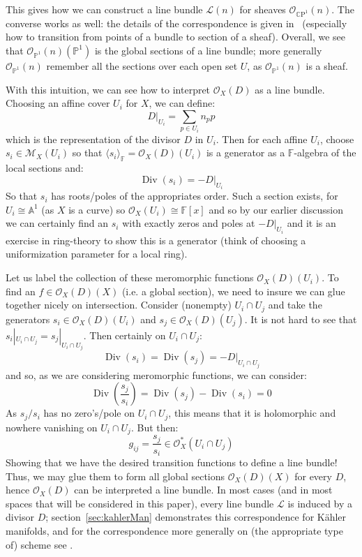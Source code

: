 \documentclass{book}
\newcommand{\A}{{\mathbb{A}}}
\newcommand{\F}{{\mathbb{F}}}
\renewcommand{\P}{{\mathbb{P}}}
\newcommand{\CM}{{\mathcal{M}}}
\newcommand{\CL}{{\mathcal{L}}}
\newcommand{\CO}{{\mathcal{O}}}
\newcommand{\CP}{{\mathbb{C}\mathrm{P}}}
\renewcommand{\div}{{\operatorname{Div}}}
\begin{document}
This gives how we can construct a line bundle $\CL(n)$ for sheaves $\CO_{\CP^1}(n)$. The converse works as
well: the details of the correspondence is given in~\cite[section~4.1]{NateAlgGeo} (especially how to
transition from points of a bundle to section of a sheaf). Overall, we see that $\CO_{\P^1}(n)(\P^1)$ is the
global sections of a line bundle; more generally $\CO_{\P^1}(n)$ remember all the sections over each open set
$U$, as $\CO_{\P^1}(n)$ is a sheaf.

With this intuition, we can see how to interpret $\CO_X(D)$ as a line bundle. Choosing an affine cover $U_i$
for $X$, we can define:
\[
  D|_{U_i} = \sum_{p \in U_i} n_pp
\]
which is the representation of the divisor $D$ in $U_i$. Then for each affine $U_i$, choose $s_i \in \CM_X(U_i)$
so that $\langle s_i \rangle_\F = \CO_X(D)(U_i)$ is a generator as a $\F$-algebra of the local sections and:
\[
  \div(s_i) = -D|_{U_i}
\]
So that $s_i$ has roots/poles of the appropriates order. Such a section exists, for $U_i \cong \A^1$ (as $X$
is a curve) so $\CO_X(U_i) \cong \F[x]$ and so by our earlier discussion we can certainly find an $s_i$ with
exactly zeros and poles at $-D|_{U_i}$ and it is an exercise in ring-theory to show this is a generator (think
of choosing a uniformization parameter for a local ring).

Let us label the collection of these meromorphic functions $\CO_X(D)(U_i)$. To find an $f \in \CO_X(D)(X)$ (i.e.
a global section), we need to insure we can glue together nicely on intersection. Consider (nonempty)
$U_i\cap U_j$ and take the generators $s_i \in \CO_X(D)(U_i)$ and $s_j \in \CO_X(D)(U_j)$. It is not hard to
see that $s_i|_{U_i\cap U_j} =
s_j|_{U_i\cap U_j}$. Then certainly on $U_i\cap U_j$:
\[
  \div(s_i) = \div(s_j) = -D|_{U_i\cap U_j}
\]
and so, as we are considering meromorphic functions, we can consider:
\[
  \div \left(\frac{s_j}{s_i}\right) = \div(s_j) - \div(s_i) = 0
\]
As $s_j/s_i$ has no zero's/pole on $U_i\cap U_j$, this means that it is holomorphic and nowhere vanishing on
$U_i\cap U_j$. But then:
\[
  g_{ij} = \frac{s_j}{s_i} \in \CO_X^*(U_i\cap U_j)
\]
Showing that we have the desired transition functions to define a line bundle! Thus, we may glue them to form
all global sections $\CO_{X}(D)(X)$ for every $D$, hence $\CO_X(D)$ can be interpreted a line bundle. In most
cases (and in most spaces that will be considered in this paper), every line bundle $\CL$ is induced by a
divisor $D$; section~\ref{sec:kahlerMan} demonstrates this correspondence for K\"ahler manifolds, and for the
correspondence more generally on (the appropriate type of) scheme see \cite[section~4.3]{NateAlgGeo}.
\end{document}
